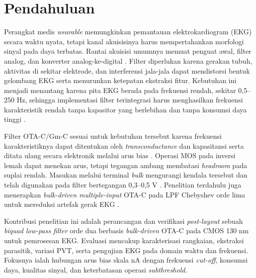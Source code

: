 \section{Pendahuluan}

Perangkat medis \textit{wearable} memungkinkan pemantauan elektrokardiogram (EKG) secara waktu nyata, tetapi kanal akuisisinya harus mempertahankan morfologi sinyal pada daya terbatas. Rantai akuisisi umumnya memuat penguat awal, filter analog, dan konverter analog-ke-digital \cite{Bio_signal_Processing,signal_processing_block}. Filter diperlukan karena gerakan tubuh, aktivitas di sekitar elektrode, dan interferensi jala-jala dapat mendistorsi bentuk gelombang EKG serta menurunkan ketepatan ekstraksi fitur. Kebutuhan ini menjadi menantang karena pita EKG berada pada frekuensi rendah, sekitar 0,5--250 Hz, sehingga implementasi filter terintegrasi harus menghasilkan frekuensi karakteristik rendah tanpa kapasitor yang berlebihan dan tanpa konsumsi daya tinggi \cite{Advanced_low_power_filter,Noise_ECG}.

Filter OTA-C/Gm-C sesuai untuk kebutuhan tersebut karena frekuensi karakteristiknya dapat ditentukan oleh \textit{transconductance} dan kapasitansi serta ditata ulang secara elektronik melalui arus bias \cite{OTA-C,gm_c}. Operasi MOS pada inversi lemah dapat menekan arus, tetapi tegangan ambang membatasi \textit{headroom} pada suplai rendah. Masukan melalui terminal \textit{bulk} mengurangi kendala tersebut dan telah digunakan pada filter bertegangan 0,3--0,5 V \cite{BD_4LPF,BulkInputOTA}. Penelitian terdahulu juga menerapkan \textit{bulk-driven multiple-input} OTA-C pada LPF Chebyshev orde lima untuk mereduksi artefak gerak EKG \cite{MIOTA-OTA}.

Kontribusi penelitian ini adalah perancangan dan verifikasi \textit{post-layout} sebuah \textit{biquad low-pass filter} orde dua berbasis \textit{bulk-driven} OTA-C pada CMOS 130 nm untuk pemrosesan EKG. Evaluasi mencakup karakterisasi rangkaian, ekstraksi parasitik, variasi PVT, serta pengujian EKG pada domain waktu dan frekuensi. Fokusnya ialah hubungan arus bias skala nA dengan frekuensi \textit{cut-off}, konsumsi daya, kualitas sinyal, dan keterbatasan operasi \textit{subthreshold}.
